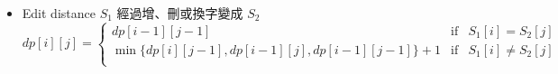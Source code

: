 \begin{itemize}

\item Edit distance
    \subitem $S_1$ 經過增、刪或換字變成 $S_2$
    \subitem $dp[i][j] = \left \{
        \begin{array}{lrc}
            dp[i-1][j-1] & \mbox{if} & S_1[i] = S_2[j] \\
            \min\{ dp[i][j-1], dp[i-1][j], dp[i-1][j-1]\}+1 & \mbox{if} & S_1[i] \neq S_2[j] \\
        \end{array}\right .$
    
\end{itemize}